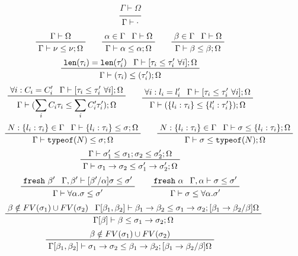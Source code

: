 \documentclass[letterpaper]{article}
\begin{document}
\begin{figure}
  $$ \boxed{\Gamma\vdash\Omega} $$
  $$ $$
  $$ \prfaxiom{\Gamma\vdash\cdot} $$
  $$ \prftree{\prfassumption{\Gamma\vdash\Omega}}
             {\prfassumption{\Gamma\vdash\nu\leq\nu;\Omega}}\qquad
     \prftree{\prfassumption{\alpha\in\Gamma}}
             {\prfassumption{\Gamma\vdash\Omega}}
             {\Gamma\vdash\alpha\leq\alpha;\Omega}\qquad
     \prftree{\prfassumption{\beta\in\Gamma}}
             {\prfassumption{\Gamma\vdash\Omega}}
             {\Gamma\vdash\beta\leq\beta;\Omega} $$
  $$ \prftree{\prfassumption{\texttt{len}(\tau_i)=\texttt{len}(\tau'_i)}}
             {\prfassumption{\Gamma\vdash[\tau_i\leq\tau'_i\ \forall i];\Omega}}
             {\Gamma\vdash(\tau_i)\leq(\tau'_i);\Omega} $$
  $$ \prftree{\prfassumption{\forall i:C_i=C'_i}}
             {\prfassumption{\Gamma\vdash[\tau_i\leq\tau'_i\ \forall i];\Omega}}
             {\Gamma\vdash(\sum_iC_i\tau_i\leq\sum_iC'_i\tau'_i);\Omega}\qquad
     \prftree{\prfassumption{\forall i:l_i=l'_i}}
             {\prfassumption{\Gamma\vdash[\tau_i\leq\tau'_i\ \forall i];\Omega}}
             {\Gamma\vdash(\{l_i:\tau_i\}\leq\{l'_i:\tau'_i\});\Omega} $$
  $$ \prftree{\prfassumption{N:\{l_i:\tau_i\}\in\Gamma}}
             {\prfassumption{\Gamma\vdash\{l_i:\tau_i\}\leq\sigma};\Omega}
             {\Gamma\vdash\texttt{typeof}(N)\leq\sigma;\Omega}\qquad
     \prftree{\prfassumption{N:\{l_i:\tau_i\}\in\Gamma}}
             {\prfassumption{\Gamma\vdash\sigma\leq\{l_i:\tau_i\};\Omega}}
             {\Gamma\vdash\sigma\leq\texttt{typeof}(N);\Omega} $$
  $$ \prftree{\prfassumption{\Gamma\vdash\sigma'_1\leq\sigma_1;\sigma_2\leq\sigma'_2;\Omega}}
             {\Gamma\vdash\sigma_1\rightarrow\sigma_2\leq\sigma'_1\rightarrow\sigma'_2;\Omega} $$
  $$ \prftree{\prfassumption{\texttt{fresh}\ \beta'}}
             {\prfassumption{\Gamma,\beta'\vdash[\beta'/\alpha]\sigma\leq\sigma'}}
             {\Gamma\vdash\forall\alpha.\sigma\leq\sigma'}\qquad
     \prftree{\prfassumption{\texttt{fresh}\ \alpha}}
             {\prfassumption{\Gamma,\alpha\vdash\sigma\leq\sigma'}}
             {\Gamma\vdash\sigma\leq\forall\alpha.\sigma'} $$
  $$ \prftree{\prfassumption{\beta\notin FV(\sigma_1)\cup FV(\sigma_2)}}
             {\prfassumption{\Gamma[\beta_1,\beta_2]\vdash\beta_1\rightarrow\beta_2\leq\sigma_1\rightarrow\sigma_2;[\beta_1\rightarrow\beta_2/\beta]\Omega}}
             {\Gamma[\beta]\vdash\beta\leq\sigma_1\rightarrow\sigma_2;\Omega} $$
  $$ \prftree{\prfassumption{\beta\notin FV(\sigma_1)\cup FV(\sigma_2)}}
             {\prfassumption{\Gamma[\beta_1,\beta_2]\vdash\sigma_1\rightarrow\sigma_2\leq\beta_1\rightarrow\beta_2;[\beta_1\rightarrow\beta_2/\beta]\Omega}}
$$
\end{figure}
\end{document}
